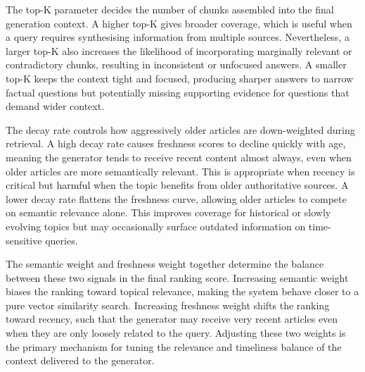 The top-K parameter decides the number of chunks assembled into the final generation context. A higher top-K gives broader coverage, which is useful when a query requires synthesising information from multiple sources. Nevertheless, a larger top-K also increases the likelihood of incorporating marginally relevant or contradictory chunks, resulting in inconsistent or unfocused answers. A smaller top-K keeps the context tight and focused, producing sharper answers to narrow factual questions but potentially missing supporting evidence for questions that demand wider context.

The decay rate controls how aggressively older articles are down-weighted during retrieval. A high decay rate causes freshness scores to decline quickly with age, meaning the generator tends to receive recent content almost always, even when older articles are more semantically relevant. This is appropriate when recency is critical but harmful when the topic benefits from older authoritative sources. A lower decay rate flattens the freshness curve, allowing older articles to compete on semantic relevance alone. This improves coverage for historical or slowly evolving topics but may occasionally surface outdated information on time-sensitive queries.

The semantic weight and freshness weight together determine the balance between these two signals in the final ranking score. Increasing semantic weight biases the ranking toward topical relevance, making the system behave closer to a pure vector similarity search. Increasing freshness weight shifts the ranking toward recency, such that the generator may receive very recent articles even when they are only loosely related to the query. Adjusting these two weights is the primary mechanism for tuning the relevance and timeliness balance of the context delivered to the generator.